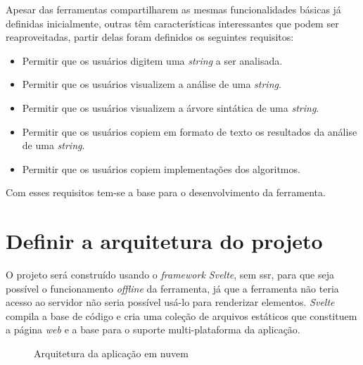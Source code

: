 Apesar das ferramentas compartilharem as mesmas funcionalidades básicas já definidas inicialmente, outras têm características interessantes que podem ser reaproveitadas, partir delas foram definidos os seguintes requisitos:
\begin{itemize}[label={$\sbullet$}]
  \item Permitir que os usuários digitem uma \textit{string} a ser analisada.
  \item Permitir que os usuários visualizem a análise de uma \textit{string}.
  \item Permitir que os usuários visualizem a árvore sintática de uma \textit{string}.
  \item Permitir que os usuários copiem em formato de texto os resultados da análise de uma \textit{string}.
  \item Permitir que os usuários copiem implementações dos algoritmos.
\end{itemize}

Com esses requisitos tem-se a base para o desenvolvimento da ferramenta.

\section{Definir a arquitetura do projeto}
O projeto será construído usando o \textit{framework Svelte}, sem \gls{ssr}, para que seja possível o funcionamento \textit{offline} da ferramenta, já que a ferramenta não teria acesso ao servidor não seria possível usá-lo para renderizar elementos. \textit{Svelte} compila a base de código e cria uma coleção de arquivos estáticos que constituem a página \textit{web} e a base para o suporte multi-plataforma da aplicação.
\begin{figure}[ht]
  \centering
  \captionsetup{width=16cm}
  \caption{Arquitetura da aplicação em nuvem}
  \label{fig:arqremo}
\end{figure}

